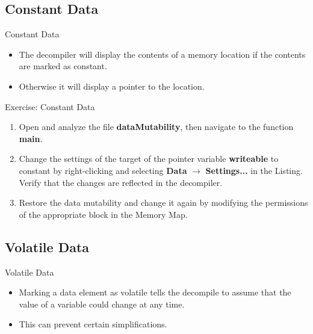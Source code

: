 \documentclass{beamer}
\begin{document}
\subsection{Constant Data}

\begin{frame}
\begin{block}{Constant Data}
\begin{itemize}
\item The decompiler will display the contents of a memory location if the contents are marked as constant.
\item Otherwise it will display a pointer to the location.
\end{itemize}
\end{block}
\end{frame}

\begin{frame}
\begin{block}{Exercise: Constant Data}
\begin{enumerate}
\item Open and analyze the file \textbf{dataMutability}, then navigate to the function \textbf{main}.
\item Change the settings of the target of the pointer variable \textbf{writeable} to constant by right-clicking and selecting \textbf{Data} $\rightarrow$ \textbf{Settings...} 
in the Listing.  Verify that the changes are reflected in the decompiler.
\item Restore the data mutability and change it again by modifying the permissions of the appropriate block in the Memory Map. 
\end{enumerate}
\end{block}
\end{frame}

\subsection{Volatile Data}
\begin{frame}
\begin{block}{Volatile Data}
\begin{itemize}
\item Marking a data element as volatile tells the decompile to assume that the value of a variable could change at any time.
\item This can prevent certain simplifications.
\end{itemize}
\end{block}
\end{frame}
\end{document}
